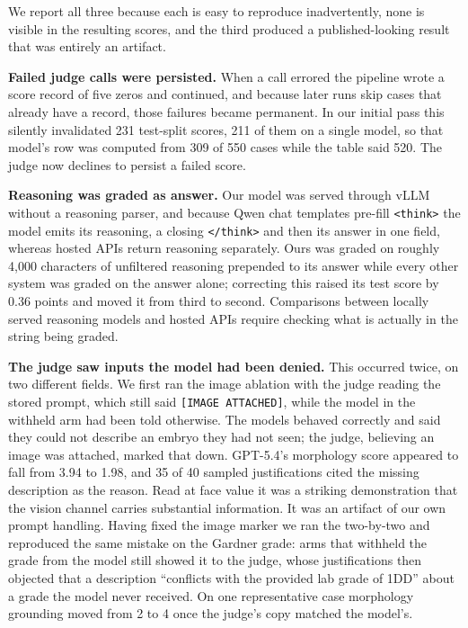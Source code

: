 We report all three because each is easy to reproduce inadvertently, none is
visible in the resulting scores, and the third produced a published-looking
result that was entirely an artifact.

\textbf{Failed judge calls were persisted.} When a call errored the pipeline
wrote a score record of five zeros and continued, and because later runs skip
cases that already have a record, those failures became permanent. In our initial
pass this silently invalidated 231 test-split scores, 211 of them on a single
model, so that model's row was computed from 309 of 550 cases while the table
said 520. The judge now declines to persist a failed score.

\textbf{Reasoning was graded as answer.} Our model was served through vLLM
without a reasoning parser, and because Qwen chat templates pre-fill
\texttt{<think>} the model emits its reasoning, a closing \texttt{</think>} and
then its answer in one field, whereas hosted APIs return reasoning separately.
Ours was graded on roughly 4,000 characters of unfiltered reasoning prepended to
its answer while every other system was graded on the answer alone; correcting
this raised its test score by 0.36 points and moved it from third to second.
Comparisons between locally served reasoning models and hosted APIs require
checking what is actually in the string being graded.

\textbf{The judge saw inputs the model had been denied.} This occurred twice, on
two different fields. We first ran the image
ablation with the judge reading the stored prompt, which still said
\texttt{[IMAGE ATTACHED]}, while the model in the withheld arm had been told
otherwise. The models behaved correctly and said they could not describe an
embryo they had not seen; the judge, believing an image was attached, marked that
down. GPT-5.4's morphology score appeared to fall from 3.94 to 1.98, and 35 of 40
sampled justifications cited the missing description as the reason. Read at face
value it was a striking demonstration that the vision channel carries substantial
information. It was an artifact of our own prompt handling. Having fixed the
image marker we ran the two-by-two and reproduced the same mistake on the Gardner
grade: arms that withheld the grade from the model still showed it to the judge,
whose justifications then objected that a description ``conflicts with the
provided lab grade of 1DD'' about a grade the model never received. On one
representative case morphology grounding moved from 2 to 4 once the judge's copy
matched the model's.

